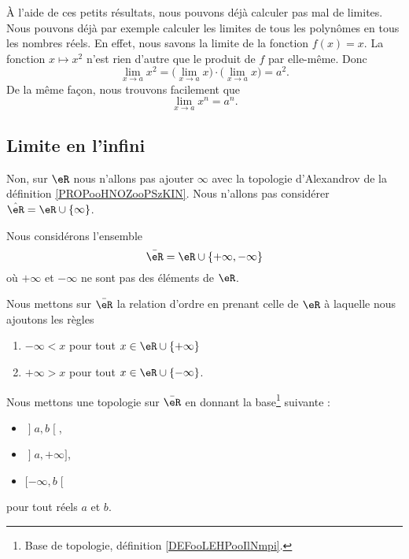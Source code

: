 À l'aide de ces petits résultats, nous pouvons déjà calculer pas mal de limites. Nous pouvons déjà par exemple calculer les limites de tous les polynômes en tous les nombres réels. En effet, nous savons la limite de la fonction $f(x)=x$. La fonction $x\mapsto x^2$ n'est rien d'autre que le produit de $f$ par elle-même. Donc
\[
  \lim_{x\to a}x^2=\big( \lim_{x\to a}x\big)\cdot\big( \lim_{x\to a}x \big)=a^2.
\]
De la même façon, nous trouvons facilement que
\begin{equation}
 \lim_{x\to a}x^n=a^n.
\end{equation}


\subsection{Limite en l'infini}

Non, sur \( \eR\) nous n'allons pas ajouter \( \infty\) avec la topologie d'Alexandrov de la définition \ref{PROPooHNOZooPSzKIN}. Nous n'allons pas considérer \( \hat \eR=\eR\cup\{ \infty \}\).

\begin{definition}       \label{DEFooRUyiBSUooALDDOa}
    Nous considérons l'ensemble
    \begin{equation}
        \bar \eR=\eR\cup\{ +\infty,-\infty \}
    \end{equation}
    où \( +\infty\) et \( -\infty\) ne sont pas des éléments de \( \eR\).

    Nous mettons sur \( \bar\eR\) la relation d'ordre en prenant celle de \( \eR\) à laquelle nous ajoutons les règles
    \begin{enumerate}
        \item
            \( -\infty<x\) pour tout \( x\in\eR\cup\{ +\infty \}\)
        \item
            \( +\infty>x\) pour tout \( x\in \eR\cup\{-\infty  \}\).
    \end{enumerate}

    Nous mettons une topologie sur \( \bar\eR\) en donnant la base\footnote{Base de topologie, définition \ref{DEFooLEHPooIlNmpi}.} suivante :
    \begin{itemize}
        \item \( \mathopen] a , b \mathclose[\),
        \item \( \mathopen] a , +\infty \mathclose]\),
        \item \( \mathopen[ -\infty , b \mathclose[\)
    \end{itemize}
    pour tout réels \( a\) et \( b\).
\end{definition}

